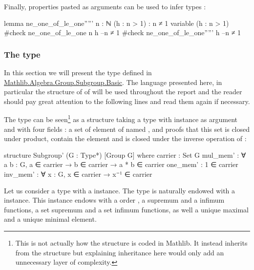 Finally, properties pasted as arguments can be used to infer types :
\begin{leancode}
lemma ne_one_of_le_one''''' {n : ℕ} (h : n > 1) : n ≠ 1
variable (h : n > 1)
#check ne_one_of_le_one n h --n ≠ 1
#check ne_one_of_le_one''''' h --n ≠ 1
\end{leancode}

\subsubsection{The  type}

In this section we will present the type  defined in \href{https://github.com/leanprover-community/mathlib4/blob/318082b0bccc3abd9d654496f7b60267f277d5fd/Mathlib/Algebra/Group/Subgroup/Basic.lean}{Mathlib.Algebra.Group.Subgroup.Basic}.
The language presented here, in particular the structure of  of  will be used throughout the report and the reader should pay great attention to the following lines and read them again if necessary.

The  type can be seen\footnote{This is not actually how the  structure is coded in Mathlib. It instead inherits from the  structure but explaining inheritance here would only add an unnecessary layer of complexity.} as a structure taking a type  with \lean{[Group G]} instance as argument and with four fields : a set of element of  named , and proofs that this set is closed under product, contain the element  and is closed under the inverse operation of  :

\begin{leancode}
structure Subgroup' (G : Type*) [Group G] where
    carrier : Set G
    mul_mem' : ∀ {a b : G}, a ∈ carrier → b ∈ carrier → a * b ∈ carrier
    one_mem' : 1 ∈ carrier
    inv_mem' : ∀ {x : G}, x ∈ carrier → x⁻¹ ∈ carrier
\end{leancode}

Let us consider a type  with a \lean{[Group G]} instance.
The type  is naturally endowed with a  instance. This instance endows  with a order , a supremum  and a infimum  functions, a set supremum  and a set infimum  functions, as well a unique maximal  and a unique minimal  element.

